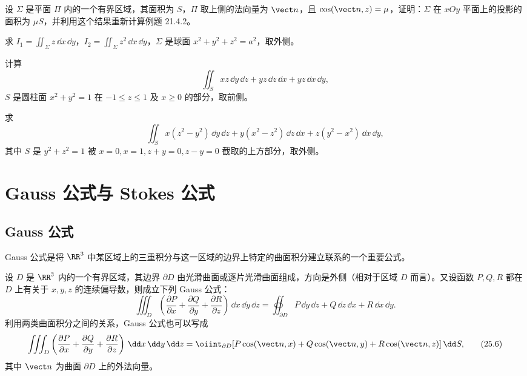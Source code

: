 \begin{xexercise}[4]
设 $\Sigma$ 是平面 $\Pi$ 内的一个有界区域，其面积为 $S$，$\Pi$ 取上侧的法向量为 $\vect n$，且 $\cos(\vect n,z)=\mu$，证明：$\Sigma$ 在 $xOy$ 平面上的投影的面积为 $\mu S$，并利用这个结果重新计算例题 21.4.2。
\end{xexercise}

\begin{xexercise}[5]
求 $I_1=\iint_\Sigma z\,\dd x\,\dd y$，$I_2=\iint_\Sigma z^2\,\dd x\,\dd y$，$\Sigma$ 是球面 $x^2+y^2+z^2=a^2$，取外侧。
\end{xexercise}

\begin{xexercise}[6]
计算
\[
  \iint_S xz\,\dd y\,\dd z+yz\,\dd z\,\dd x+yz\,\dd x\,\dd y,
\]
$S$ 是圆柱面 $x^2+y^2=1$ 在 $-1\le z\le1$ 及 $x\ge0$ 的部分，取前侧。
\end{xexercise}

\begin{xexercise}[7]
求
\[
  \iint_S x(z^2-y^2)\,\dd y\,\dd z+y(x^2-z^2)\,\dd z\,\dd x+z(y^2-x^2)\,\dd x\,\dd y,
\]
其中 $S$ 是 $y^2+z^2=1$ 被 $x=0,x=1,z+y=0,z-y=0$ 截取的上方部分，取外侧。
\end{xexercise}

\section{Gauss 公式与 Stokes 公式}

\subsection{Gauss 公式}

Gauss 公式是将 $\RR^3$ 中某区域上的三重积分与这一区域的边界上特定的曲面积分建立联系的一个重要公式。

设 $D$ 是 $\RR^3$ 内的一个有界区域，其边界 $\partial D$ 由光滑曲面或逐片光滑曲面组成，方向是外侧（相对于区域 $D$ 而言）。又设函数 $P,Q,R$ 都在 $D$ 上有关于 $x,y,z$ 的连续偏导数，则成立下列 Gauss 公式：
\begin{equation}
  \iiint_D\left(\frac{\partial P}{\partial x}+\frac{\partial Q}{\partial y}+\frac{\partial R}{\partial z}\right)
  \,\dd x\,\dd y\,\dd z
  =\oiint_{\partial D}P\,\dd y\,\dd z+Q\,\dd z\,\dd x+R\,\dd x\,\dd y.
  \tag{25.5}
\end{equation}
利用两类曲面积分之间的关系，Gauss 公式也可以写成
\begin{equation}
\begin{aligned}
  \iiint_D\left(\frac{\partial P}{\partial x}+\frac{\partial Q}{\partial y}+\frac{\partial R}{\partial z}\right)
  \,\dd x\,\dd y\,\dd z
  =\oiint_{\partial D}[P\cos(\vect n,x)+Q\cos(\vect n,y)+R\cos(\vect n,z)]\,\dd S,
\end{aligned}
\tag{25.6}
\end{equation}
其中 $\vect n$ 为曲面 $\partial D$ 上的外法向量。

